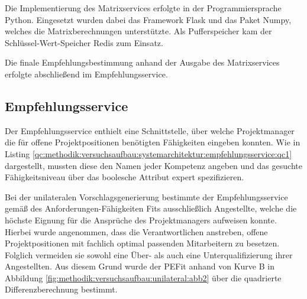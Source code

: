 Die Implementierung des Matrixservices erfolgte in der Programmiersprache Python. Eingesetzt wurden dabei das Framework Flask und das Paket Numpy, welches die Matrixberechnungen unterstützte. Als Pufferspeicher kam der Schlüssel-Wert-Speicher Redis zum Einsatz.

Die finale Empfehlungsbestimmung anhand der Ausgabe des Matrixservices erfolgte abschließend im Empfehlungsservice.

\subsection{Empfehlungsservice}
\label{ch:methodik:versuchsaufbau:systemarchitektur:empfehlungsservice}
Der Empfehlungsservice enthielt eine Schnittstelle, über welche Projektmanager die für offene Projektpositionen benötigten Fähigkeiten eingeben konnten. Wie in Listing \ref{qc:methodik:versuchsaufbau:systemarchitektur:empfehlungsservice:qc1} dargestellt, mussten diese den Namen jeder Kompetenz angeben und das gesuchte Fähigkeitsniveau über das boolesche Attribut expert spezifizieren.



Bei der unilateralen Vorschlagsgenerierung bestimmte der Empfehlungsservice gemäß des Anforderungen-Fähigkeiten Fits ausschließlich Angestellte, welche die höchste Eignung für die Ansprüche des Projektmanagers aufweisen konnte. Hierbei wurde angenommen, dass die Verantwortlichen anstreben, offene Projektpositionen mit fachlich optimal passenden Mitarbeitern zu besetzen. Folglich vermeiden sie sowohl eine Über- als auch eine Unterqualifizierung ihrer Angestellten. Aus diesem Grund wurde der \ac{PEFit} anhand von Kurve B in Abbildung \ref{fig:methodik:versuchsaufbau:unilateral:abb2} über die quadrierte Differenzberechnung bestimmt.

